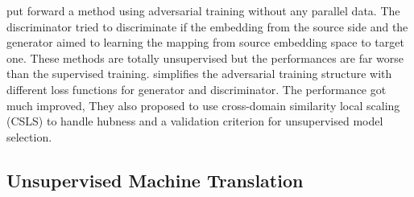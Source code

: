 \cite{zhang2017adversarial} put forward  a method using adversarial training without any parallel data. The discriminator tried to discriminate if the embedding from the source side and the generator aimed to learning the mapping from source embedding space to target one. These methods are totally unsupervised but the performances are far worse than the supervised training. \cite{conneau2017word} simplifies the adversarial training structure with different loss functions for generator and discriminator. The performance got much improved, They also proposed to use cross-domain similarity local scaling (CSLS) to handle hubness and a validation criterion for unsupervised model selection.


\subsection{Unsupervised Machine Translation}

